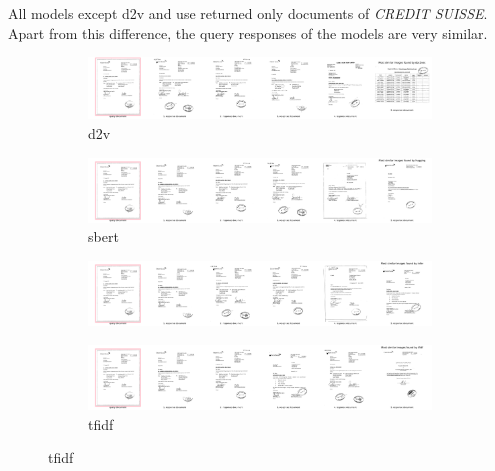 All models except \ac{d2v} and \ac{use} returned only documents of \textit{CREDIT SUISSE}.
Apart from this difference, the query responses of the models are very similar.


\begin{figure}[h!]
    \begin{subfigure}{\textwidth}
        \centering
        \includegraphics[width=1\textwidth]{images/query_results/4b4d0a9ee0c7283e5bfd69c402c73b2140bf90351c8f44d6809afe23c6dfaa50/Most_similar_images_found_by_doc2vec.pdf}
        \caption{\ac{d2v}}
        \label{fig:query_resp_doc2vec}
    \end{subfigure}

    \begin{subfigure}{\textwidth}
        \centering
        \includegraphics[width=1\textwidth]{images/query_results/4b4d0a9ee0c7283e5bfd69c402c73b2140bf90351c8f44d6809afe23c6dfaa50/Most_similar_images_found_by_hugging.pdf}
        \caption{\ac{sbert}}
        \label{fig:query_resp_sbert}
    \end{subfigure}

    \begin{subfigure}{\textwidth}
        \centering
        \includegraphics[width=1\textwidth]{images/query_results/4b4d0a9ee0c7283e5bfd69c402c73b2140bf90351c8f44d6809afe23c6dfaa50/Most_similar_images_found_by_infer.pdf}
        \caption{\infersent{}}
        \label{fig:query_resp_infer}
    \end{subfigure}

    \begin{subfigure}{\textwidth}
        \centering
        \includegraphics[width=1\textwidth]{images/query_results/4b4d0a9ee0c7283e5bfd69c402c73b2140bf90351c8f44d6809afe23c6dfaa50/Most_similar_images_found_by_tfidf.pdf}
        \caption{\ac{tfidf}}
        \label{fig:query_resp_tfidf}
    \end{subfigure}


\end{figure}
